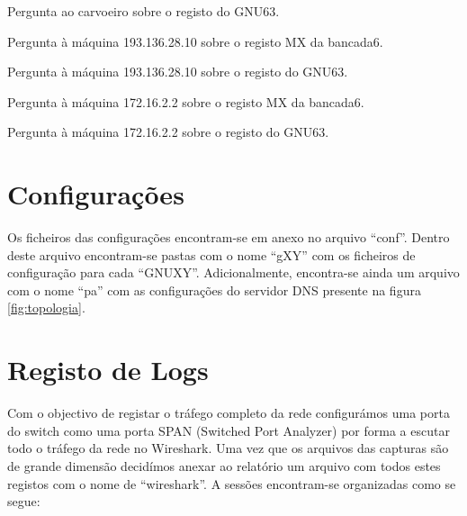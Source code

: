 \documentclass[a4paper,12pt]{article}
\begin{document}
\begin{program}
	
  \caption{Pergunta ao carvoeiro sobre o registo do GNU63.}
	\label{log:carvoeiroa}
\end{program}

\begin{program}
	
  \caption{Pergunta à máquina 193.136.28.10 sobre o registo MX da bancada6.}
	\label{log:193mx}
\end{program}

\begin{program}
	
  \caption{Pergunta à máquina 193.136.28.10 sobre o registo do GNU63.}
	\label{log:193a}
\end{program}

\begin{program}
	
  \caption{Pergunta à máquina 172.16.2.2 sobre o registo MX da bancada6.}
	\label{log:172mx}
\end{program}

\begin{program}
	
  \caption{Pergunta à máquina 172.16.2.2 sobre o registo do GNU63.}
	\label{log:172a}
\end{program}


\section{Configurações}

Os ficheiros das configurações encontram-se em anexo no arquivo ``conf''.
Dentro deste arquivo encontram-se pastas com o nome ``gXY'' com os ficheiros
de configuração para cada ``GNUXY''. Adicionalmente, encontra-se ainda um
arquivo com o nome ``pa'' com as configurações do servidor DNS presente na 
figura \ref{fig:topologia}.

\section{Registo de Logs}

Com o objectivo de registar o tráfego completo da rede configurámos uma porta
do switch como uma porta SPAN (Switched Port Analyzer) por forma a escutar todo
o tráfego da rede no Wireshark.
Uma vez que os arquivos das capturas são de grande dimensão decidímos anexar 
ao relatório um arquivo com todos estes registos com o nome de ``wireshark''. 
A sessões encontram-se organizadas como se segue:
\end{document}
